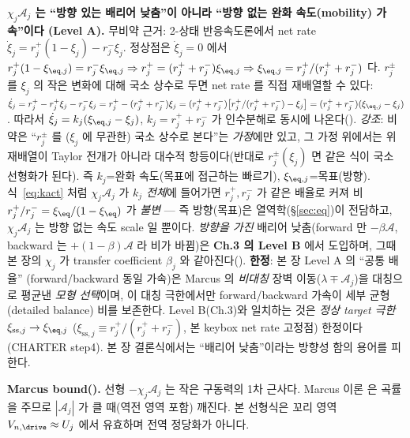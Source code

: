 \begin{keybox}
\textbf{$\chi_j\mathcal A_j$ 는 ``방향 있는 배리어 낮춤''이 아니라 ``방향 없는 완화 속도(mobility) 가속''이다
(Level A).} 무비약 근거: 2-상태 반응속도론에서 net rate $\dot\xi_j=r_j^+(1-\xi_j)-r_j^-\xi_j$. 정상점은
$\dot\xi_j=0$ 에서 $r_j^+(1-\xi_{\eq,j})=r_j^-\xi_{\eq,j}\Rightarrow r_j^+=(r_j^++r_j^-)\xi_{\eq,j}
\Rightarrow\xi_{\eq,j}=r_j^+/(r_j^++r_j^-)$ 다. $r_j^\pm$ 를 $\xi_j$ 의 작은 변화에 대해 국소 상수로 두면
net rate 를 직접 재배열할 수 있다: $\dot\xi_j=r_j^+-r_j^+\xi_j-r_j^-\xi_j=r_j^+-(r_j^++r_j^-)\xi_j
=(r_j^++r_j^-)\big[r_j^+/(r_j^++r_j^-)-\xi_j\big]=(r_j^++r_j^-)(\xi_{\eq,j}-\xi_j)$. 따라서
$\dot\xi_j=k_j(\xi_{\eq,j}-\xi_j)$, $k_j=r_j^++r_j^-$ 가 인수분해로 동시에 나온다(). \emph{강조}: 비약은
``$r_j^\pm$ 를 ($\xi_j$ 에 무관한) 국소 상수로 본다''는 \emph{가정}에만 있고, 그 가정 위에서는 위 재배열이 Taylor
전개가 아니라 대수적 항등이다(반대로 $r_j^\pm(\xi_j)$ 면 같은 식이 국소 선형화가 된다). 즉 $k_j$=완화 속도(목표에 접근하는 빠르기),
$\xi_{\eq,j}$=목표(방향). 식~\eqref{eq:kact} 처럼 $\chi_j\mathcal A_j$ 가 \emph{$k_j$
전체}에 들어가면 $r_j^+,r_j^-$ 가 같은 배율로 커져 비 $r_j^+/r_j^-=\xi_\eq/(1-\xi_\eq)$ 가 \emph{불변}
— 즉 방향(목표)은 열역학(\S\ref{sec:eq})이 전담하고, $\chi_j\mathcal A_j$ 는 방향 없는 속도 scale 일 뿐이다.
\emph{방향을 가진} 배리어 낮춤(forward 만 $-\beta\mathcal A$,
backward 는 $+(1-\beta)\mathcal A$ 라 비가 바뀜)은 \textbf{Ch.3 의 Level B} 에서 도입하며, 그때 본 장의
$\chi_j$ 가 transfer coefficient $\beta_j$ 와 같아진다(). \textbf{한정}: 본 장 Level A 의 ``공통 배율''
(forward/backward 동일 가속)은 Marcus 의 \emph{비대칭} 장벽 이동($\lambda\mp\mathcal A_j$)을 대칭으로 평균낸
\emph{모형 선택}이며, 이 대칭 극한에서만 forward/backward 가속이 세부 균형(detailed balance) 비를 보존한다. Level B(Ch.3)와
일치하는 것은 \emph{정상 target 극한} $\xi_{\mathrm{ss},j}\to\xi_{\eq,j}$ ($\xi_{\mathrm{ss},j}\equiv r_j^+/(r_j^++r_j^-)$, 본 keybox net rate 고정점) 한정이다(CHARTER step4). 본 장
결론식에서는 ``배리어 낮춤''이라는 방향성 함의 용어를 피한다.
\end{keybox}
\begin{boundbox}
\textbf{Marcus bound().} 선형 $-\chi_j\mathcal A_j$ 는 작은 구동력의 1차 근사다. Marcus 이론
\cite{marcus1956} 은 곡률을 주므로 $|\mathcal A_j|$ 가 클 때(역전 영역 포함) 깨진다. 본 선형식은 꼬리 영역
$V_{n,\drive}\approx U_j$ 에서 유효하며 전역 정당화가 아니다.
\end{boundbox}

